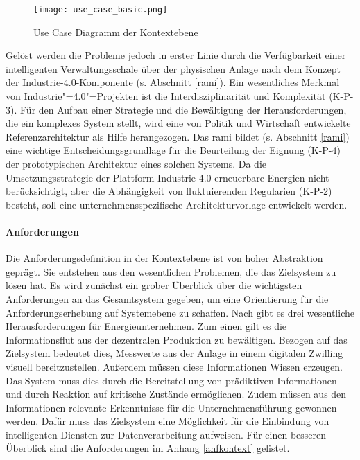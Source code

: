 \begin{figure}[ht]
  \centering
  \texttt{[image: use\_case\_basic.png]}
  \caption[Use Case Diagramm der Kontextebene]{Use Case Diagramm der Kontextebene}
  \label{usecase_basic}
\end{figure}


\noindent Gelöst werden die Probleme jedoch in erster Linie durch die Verfügbarkeit einer intelligenten Verwaltungsschale über der physischen Anlage nach dem Konzept der Industrie-4.0-Komponente (s. Abschnitt \ref{rami}).
Ein wesentliches Merkmal von Industrie"=4.0"=Projekten ist die Interdisziplinarität und Komplexität (K-P-3). Für den Aufbau einer Strategie und die Bewältigung der Herausforderungen, die ein komplexes System stellt, wird eine von Politik und Wirtschaft entwickelte Referenzarchitektur als Hilfe herangezogen. Das \ac{rami} bildet (s. Abschnitt \ref{rami}) eine wichtige Entscheidungsgrundlage für die Beurteilung der Eignung (K-P-4) der prototypischen Architektur eines solchen Systems. Da die Umsetzungsstrategie der Plattform Industrie 4.0 \citep{BITKOM2015} erneuerbare Energien nicht berücksichtigt, aber die Abhängigkeit von fluktuierenden Regularien (K-P-2) besteht, soll eine unternehmensspezifische Architekturvorlage entwickelt werden.


\paragraph{Anforderungen}

Die Anforderungsdefinition in der Kontextebene ist von hoher Abstraktion geprägt. Sie entstehen aus den wesentlichen Problemen, die das Zielsystem zu lösen hat. Es wird zunächst ein grober Überblick über die wichtigsten Anforderungen an das Gesamtsystem gegeben, um eine Orientierung für die Anforderungserhebung auf Systemebene zu schaffen. Nach \citet{Doleski2016} gibt es drei wesentliche Herausforderungen für Energieunternehmen. Zum einen gilt es die Informationsflut aus der dezentralen Produktion zu bewältigen. Bezogen auf das Zielsystem bedeutet dies, Messwerte aus der Anlage in einem digitalen Zwilling visuell bereitzustellen. Außerdem müssen diese Informationen Wissen erzeugen. Das System muss dies durch die Bereitstellung von prädiktiven Informationen und durch Reaktion auf kritische Zustände ermöglichen. Zudem müssen aus den Informationen relevante Erkenntnisse für die Unternehmensführung gewonnen werden. Dafür muss das Zielsystem eine Möglichkeit für die Einbindung von intelligenten Diensten zur Datenverarbeitung aufweisen. Für einen besseren Überblick sind die Anforderungen im Anhang  \ref{anfkontext} gelistet.


